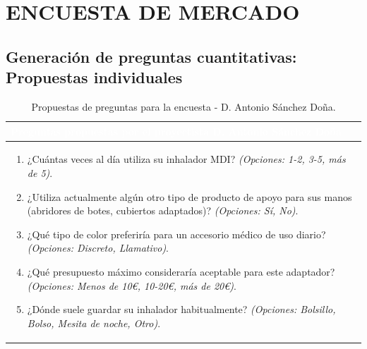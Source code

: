 \documentclass[11pt,a4paper]{article}
\begin{document}
\section{ENCUESTA DE MERCADO}
\subsection{Generación de preguntas cuantitativas: Propuestas individuales}


\vspace{0.4cm}

\begin{table}[H]
    \centering
    \small
    \renewcommand{\arraystretch}{1.5}
    \begin{tabularx}{\linewidth}{|X|}
        \hline
        \rowcolor{ArthroNavy}
        \textcolor{white}{\textbf{Preguntas propuestas por el proyectista D. Antonio Sánchez Doña}} \\ \hline
        \rowcolor{ArthroTeal!5}
        \vspace{0.1cm}
        \begin{enumerate}[leftmargin=0.8cm, itemsep=0.2cm]
            \item ¿Cuántas veces al día utiliza su inhalador MDI? \textit{(Opciones: 1-2, 3-5, más de 5)}.
            \item ¿Utiliza actualmente algún otro tipo de producto de apoyo para sus manos (abridores de botes, cubiertos adaptados)? \textit{(Opciones: Sí, No)}.
            \item ¿Qué tipo de color preferiría para un accesorio médico de uso diario? \textit{(Opciones: Discreto, Llamativo)}.
            \item ¿Qué presupuesto máximo consideraría aceptable para este adaptador? \textit{(Opciones: Menos de 10€, 10-20€, más de 20€)}.
            \item ¿Dónde suele guardar su inhalador habitualmente? \textit{(Opciones: Bolsillo, Bolso, Mesita de noche, Otro)}.
        \end{enumerate}
        \vspace{0.1cm} \\ \hline
    \end{tabularx}
    \caption{Propuestas de preguntas para la encuesta - D. Antonio Sánchez Doña.}
    \label{tab:encuesta_antonio}
\end{table}

\vspace{0.4cm}
\end{document}
